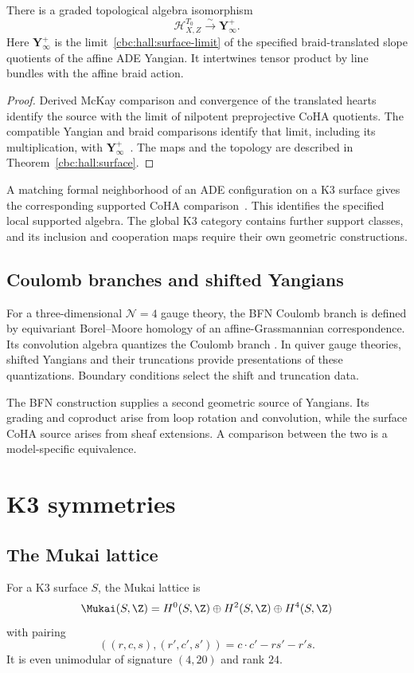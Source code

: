 \begin{theorem}
There is a graded topological algebra isomorphism
\[
 \mathcal H^{T_0}_{X,Z}\xrightarrow{\sim}\mathbf Y^+_\infty.
\]
Here $\mathbf Y^+_\infty$ is the limit~\eqref{cbc:hall:surface-limit} of the specified braid-translated slope quotients of the affine ADE Yangian.
It intertwines tensor product by line bundles with the affine braid action.
\end{theorem}
\begin{proof}
Derived McKay comparison and convergence of the translated hearts identify the source with the limit of nilpotent preprojective CoHA quotients.
The compatible Yangian and braid comparisons identify that limit, including its multiplication, with $\mathbf Y^+_\infty$~\cite[Theorems~III.7.5, III.7.8 and Proposition~III.7.14]{DPPSSV}.
The maps and the topology are described in Theorem~\ref{cbc:hall:surface}.
\end{proof}

A matching formal neighborhood of an ADE configuration on a K3 surface gives the corresponding supported CoHA comparison~\cite[Theorem~III.7.2(ii)]{DPPSSV}.
This identifies the specified local supported algebra.
The global K3 category contains further support classes, and its inclusion and cooperation maps require their own geometric constructions.

\chapter{Coulomb branches and shifted Yangians}
For a three-dimensional $\mathcal N=4$ gauge theory, the BFN Coulomb branch is defined by equivariant Borel--Moore homology of an affine-Grassmannian correspondence. Its convolution algebra quantizes the Coulomb branch \cite{BFN}. In quiver gauge theories, shifted Yangians and their truncations provide presentations of these quantizations. Boundary conditions select the shift and truncation data.

The BFN construction supplies a second geometric source of Yangians. Its grading and coproduct arise from loop rotation and convolution, while the surface CoHA source arises from sheaf extensions. A comparison between the two is a model-specific equivalence.

\part{K3 symmetries}

\chapter{The Mukai lattice}
For a K3 surface $S$, the Mukai lattice is
\[
 \Mukai(S,\Z)=H^0(S,\Z)\oplus H^2(S,\Z)\oplus H^4(S,\Z)
\]
with pairing
\[
 ((r,c,s),(r',c',s'))=c\cdot c'-rs'-r's.
\]
It is even unimodular of signature $(4,20)$ and rank $24$.


